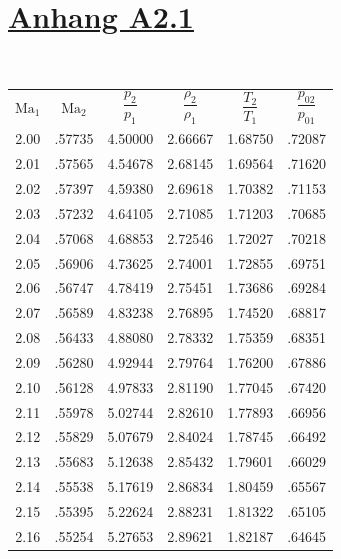 \section*{\underline{Anhang A2.1}}
\\ \vspace{4mm}%
\begin{minipage}{0.47\textwidth}
    \centering
    \begin{tabular}{c|c|c|c|c|c}
        $\text{Ma}_1$ & $\text{Ma}_2$ & $\dfrac{p_2}{p_1}$ & $\dfrac{\rho_2}{\rho_1}$ & $\dfrac{T_2}{T_1}$ & $\dfrac{p_{02}}{p_{01}}$ \\[2.2ex] \arrayrulecolor{Blue}\hline\arrayrulecolor{black}
        2.00 & .57735 & 4.50000 & 2.66667 & 1.68750 & .72087 \\
        2.01 & .57565 & 4.54678 & 2.68145 & 1.69564 & .71620 \\ \arrayrulecolor{Red}\hline\arrayrulecolor{black}
        2.02 & .57397 & 4.59380 & 2.69618 & 1.70382 & .71153 \\
        2.03 & .57232 & 4.64105 & 2.71085 & 1.71203 & .70685 \\
        2.04 & .57068 & 4.68853 & 2.72546 & 1.72027 & .70218 \\
        2.05 & .56906 & 4.73625 & 2.74001 & 1.72855 & .69751 \\
        2.06 & .56747 & 4.78419 & 2.75451 & 1.73686 & .69284 \\
        2.07 & .56589 & 4.83238 & 2.76895 & 1.74520 & .68817 \\
        2.08 & .56433 & 4.88080 & 2.78332 & 1.75359 & .68351 \\
        2.09 & .56280 & 4.92944 & 2.79764 & 1.76200 & .67886 \\
        2.10 & .56128 & 4.97833 & 2.81190 & 1.77045 & .67420 \\
        2.11 & .55978 & 5.02744 & 2.82610 & 1.77893 & .66956 \\
        2.12 & .55829 & 5.07679 & 2.84024 & 1.78745 & .66492 \\
        2.13 & .55683 & 5.12638 & 2.85432 & 1.79601 & .66029 \\
        2.14 & .55538 & 5.17619 & 2.86834 & 1.80459 & .65567 \\
        2.15 & .55395 & 5.22624 & 2.88231 & 1.81322 & .65105 \\
        2.16 & .55254 & 5.27653 & 2.89621 & 1.82187 & .64645 \\

\end{tabular}
\end{minipage}
